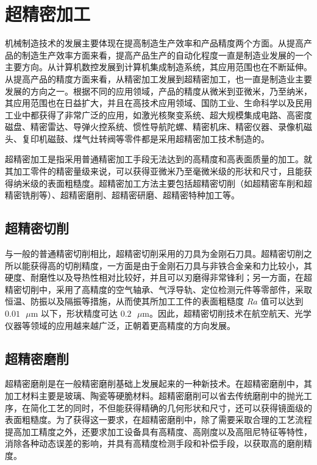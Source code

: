 \documentclass[UTF8]{ctexbook}
\newcommand{\◎}{\ensuremath{\bigcirc}}
\begin{document}
\section{超精密加工}

机械制造技术的发展主要体现在提高制造生产效率和产品精度两个方面。从提高产品的制造生产效率方面来看，提高产品生产的自动化程度一直是制造业发展的一个主要方向。从计算机数控发展到计算机集成制造系统，其应用范围也在不断延伸。从提高产品的精度方面来看，从精密加工发展到超精密加工，也一直是制造业主要发展的方向之一。根据不同的应用领域，产品的精度从微米到亚微米，乃至纳米，其应用范围也在日益扩大，并且在高技术应用领域、国防工业、生命科学以及民用工业中都获得了非常广泛的应用，如激光核聚变系统、超大规模集成电路、高密度磁盘、精密雷达、导弹火控系统、惯性导航陀螺、精密机床、精密仪器、录像机磁头、复印机磁鼓、煤气灶转阀等零件都是采用超精密加工技术制造的。

超精密加工是指采用普通精密加工手段无法达到的高精度和高表面质量的加工。就其加工零件的精密量级来说，可以获得亚微米乃至毫微米级的形状和尺寸，且能获得纳米级的表面粗糙度。超精密加工方法主要包括超精密切削（如超精密车削和超精密铣削等）、超精密磨削、超精密研磨、超精密特种加工等。

\subsection{超精密切削}

与一般的普通精密切削相比，超精密切削采用的刀具为金刚石刀具。超精密切削之所以能获得高的切削精度，一方面是由于金刚石刀具与非铁合金亲和力比较小，其硬度、耐磨性以及导热性相对比较好，并且可以刃磨得非常锋利；另一方面，在超精密切削中，采用了高精度的空气轴承、气浮导轨、定位检测元件等零部件，采取恒温、防振以及隔振等措施，从而使其所加工工件的表面粗糙度 $Ra$ 值可以达到 $0.01\text{ }\mu\text{m}$ 以下，形状精度可达 $0.2\text{ }\mu\text{m}$。因此，超精密切削技术在航空航天、光学仪器等领域的应用越来越广泛，正朝着更高精度的方向发展。

\subsection{超精密磨削}

超精密磨削是在一般精密磨削基础上发展起来的一种新技术。在超精密磨削中，其加工材料主要是玻璃、陶瓷等硬脆材料。超精密磨削可以省去传统磨削中的抛光工序，在简化工艺的同时，不但能获得精确的几何形状和尺寸，还可以获得镜面级的表面粗糙度。为了获得这一要求，在超精密磨削中，除了需要采取合理的工艺流程提高加工精度之外，还要求加工设备具有高精度、高刚度以及高阻尼特征等特性，消除各种动态误差的影响，并具有高精度检测手段和补偿手段，以获取高的磨削精度。
\end{document}
